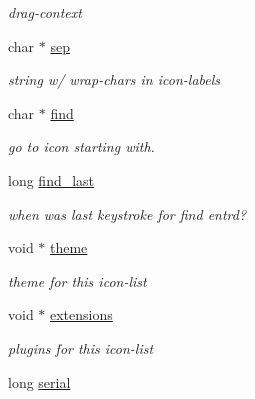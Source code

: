 \begin{CompactItemize}
\begin{CompactList}\small\item\em drag-context \item\end{CompactList}\item 
\hypertarget{struct__icon__list_o36}{
char $\ast$ \hyperlink{struct__icon__list_o36}{sep}}
\label{struct__icon__list_o36}

\begin{CompactList}\small\item\em string w/ wrap-chars in icon-labels \item\end{CompactList}\item 
char $\ast$ \hyperlink{struct__icon__list_o37}{find}
\begin{CompactList}\small\item\em go to icon starting with. \item\end{CompactList}\item 
\hypertarget{struct__icon__list_o38}{
long \hyperlink{struct__icon__list_o38}{find\_\-last}}
\label{struct__icon__list_o38}

\begin{CompactList}\small\item\em when was last keystroke for find entrd? \item\end{CompactList}\item 
\hypertarget{struct__icon__list_o39}{
void $\ast$ \hyperlink{struct__icon__list_o39}{theme}}
\label{struct__icon__list_o39}

\begin{CompactList}\small\item\em theme for this icon-list \item\end{CompactList}\item 
\hypertarget{struct__icon__list_o40}{
void $\ast$ \hyperlink{struct__icon__list_o40}{extensions}}
\label{struct__icon__list_o40}

\begin{CompactList}\small\item\em plugins for this icon-list \item\end{CompactList}\item 
\hypertarget{struct__icon__list_o41}{
long \hyperlink{struct__icon__list_o41}{serial}}
\label{struct__icon__list_o41}


\end{CompactItemize}
